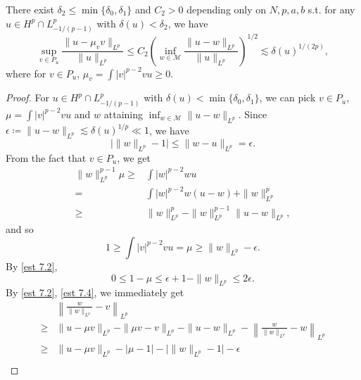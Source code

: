 \documentclass[10pt,a4paper]{amsart}
\begin{document}
\begin{proposition}\label{pro}
    There exist $\delta_2\le \min\{\delta_0,\delta_1\}$ and $C_2>0$ depending only on $N,p,a,b$ s.t. for any $u\in H^p\cap L^p_{-1/(p-1)}$ with $\delta(u) < \delta_2$, we have
    \begin{equation}
        \sup_{v\in P_u}\frac{\|u-\mu_v v\|_{L^p}}{\|u\|_{L^p}}\le C_2 \left(\inf_{w\in\mathcal{M}}\frac{\|u-w\|_{L^p}}{\|u\|_{L^p}}\right)^{1/2} \lesssim \delta(u)^{1/(2p)},
    \end{equation}
    where for $v\in P_u$, $\mu_v = \int |v|^{p-2}vu \ge 0$.
\end{proposition}

\begin{proof}
    For $u\in H^p\cap L^p_{-1/(p-1)}$ with $\delta(u)<\min\{\delta_0,\delta_1\}$, we can pick $v\in P_u$, $\mu = \int |v|^{p-2}vu$ and $w$ attaining $\inf_{w\in \mathcal{M}}\|u-w\|_{L^p}$. Since $\epsilon \coloneqq \|u-w\|_{L^p} \lesssim \delta(u)^{1/p} \ll 1$, we have
    \begin{equation}\label{est 7.2}
        \big|\|w\|_{L^p} - 1\big| \le \|w-u\|_{L^p} = \epsilon.
    \end{equation}
    From the fact that $v\in P_{u}$, we get
    \begin{align*}
        \|w\|_{L^p}^{p-1}\mu \ge{}& \int |w|^{p-2}wu\\
        ={}& \int |w|^{p-2}w(u-w) + \|w\|_{L^p}^p \\
        \ge{}& \|w\|_{L^p}^p - \|w\|_{L^p}^{p-1}\|u-w\|_{L^p},
    \end{align*}
    and so
    \begin{equation}\label{est 7.3}
        1\ge \int |v|^{p-2}vu = \mu \ge \|w\|_{L^p} - \epsilon.
    \end{equation}
    By \eqref{est 7.2},
    \begin{equation}\label{est 7.4}
        0\le 1-\mu \le \epsilon + 1-\|w\|_{L^p} \le 2\epsilon.
    \end{equation}
    By \eqref{est 7.2}, \eqref{est 7.4}, we immediately get
    \begin{equation}\label{est 7.5}
        \begin{split}
            & \left\|\frac{w}{\|w\|_{L^p}}-v\right\|_{L^p} \\
            \ge{}& \|u-\mu v\|_{L^p} - \|\mu v-v\|_{L^p} - \|u-w\|_{L^p} - \left\|\frac{w}{\|w\|_{L^p}}-w\right\|_{L^p}\\
            \ge{}& \|u-\mu v\|_{L^p} - |\mu-1| - \big|\|w\|_{L^p} - 1\big| - \epsilon\\

\end{split}
\end{equation}
\end{proof}
\end{document}
